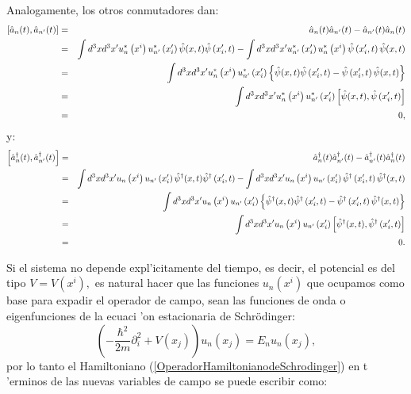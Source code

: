 Analogamente, los otros conmutadores dan:%
\begin{eqnarray}
\left[ \hat{a}_{n}(t) ,\hat{a}_{n'}(t) \right] &=&\hat{a}_{n}(t) \hat{a}_{n'}(t)
-\hat{a}_{n'}(t) \hat{a}_{n}(t) \notag \\
&=&\int d^{3}xd^{3}x'u_{n}^{\ast }\left( x^{i}\right) u_{n'}^{\ast }\left(
x'_{i}\right) \hat{\psi}(x,t) \hat{\psi}\left( x'_{i},t\right) -\int
d^{3}xd^{3}x'u_{n'}^{\ast }\left( x'_{i}\right) u_{n}^{\ast }\left( x^{i}\right)
\hat{\psi}\left( x'_{i},t\right) \hat{\psi}(x,t) \notag \\
&=&\int d^{3}xd^{3}x'u_{n}^{\ast }\left( x^{i}\right) u_{n'}^{\ast }\left(
x'_{i}\right) \left\{ \hat{\psi}(x,t) \hat{\psi}\left( x'_{i},t\right)
-\hat{\psi}\left( x'_{i},t\right) \hat{\psi}(x,t) \right\} \notag \\
&=&\int d^{3}xd^{3}x'u_{n}^{\ast }\left( x^{i}\right) u_{n'}^{\ast }\left(
x'_{i}\right) \left[ \hat{\psi}(x,t) ,\hat{\psi}\left( x'_{i},t\right) \right]
\notag \\
&=&0, \label{RelConmutacion2}
\end{eqnarray}%
y:%
\begin{eqnarray}
\left[ \hat{a}_{n}^{\dagger }(t) ,\hat{a}_{n'}^{\dagger }(t) \right]
&=&\hat{a}_{n}^{\dagger }(t) \hat{a}_{n'}^{\dagger }(t) -\hat{a}_{n'}^{\dagger
}(t) \hat{a}_{n}^{\dagger }(t) \notag \\
&=&\int d^{3}xd^{3}x'u_{n}\left( x^{i}\right) u_{n'}\left( x'_{i}\right)
\hat{\psi}^{\dagger }(x,t) \hat{\psi}^{\dagger}\left( x'_{i},t\right) -\int
d^{3}xd^{3}x'u_{n}\left( x^{i}\right) u_{n'}\left( x'_{i}\right)
\hat{\psi}^{\dagger }\left( x'_{i},t\right) \hat{\psi}^{\dagger }(x,t) \notag \\
&=&\int d^{3}xd^{3}x'u_{n}\left( x^{i}\right) u_{n'}\left( x'_{i}\right) \left\{
\hat{\psi}^{\dagger }(x,t) \hat{\psi}^{\dagger }\left( x'_{i},t\right)
-\hat{\psi}^{\dagger }\left( x'_{i},t\right) \hat{\psi}^{\dagger }(x,t) \right\}
\notag \\
&=&\int d^{3}xd^{3}x'u_{n}\left( x^{i}\right) u_{n'}\left( x'_{i}\right) \left[
\hat{\psi}^{\dagger }(x,t) ,\hat{\psi}^{\dagger }\left( x'_{i},t\right) \right]
\notag \\
&=&0. \label{RelConmutacion3}
\end{eqnarray}

Si el sistema no depende expl'icitamente del tiempo, es decir, el
potencial es del tipo $V=V\left( x^{i}\right) ,$ es natural hacer que las
funciones $u_{n}\left( x^{i}\right) $ que ocupamos como base para expadir el
operador de campo, sean las funciones de onda o eigenfunciones de la ecuaci%
'on estacionaria de Schr\"{o}dinger:%
\begin{equation*}
\left( -\frac{\hbar ^{2}}{2m}\partial _{i}^{2}+V\left( x_{j}\right) \right)
u_{n}\left( x_{j}\right) =E_{n}u_{n}\left( x_{j}\right) ,
\end{equation*}%
por lo tanto el Hamiltoniano (\ref{OperadorHamiltonianodeSchrodinger}) en t%
'erminos de las nuevas variables de campo se puede escribir como:

